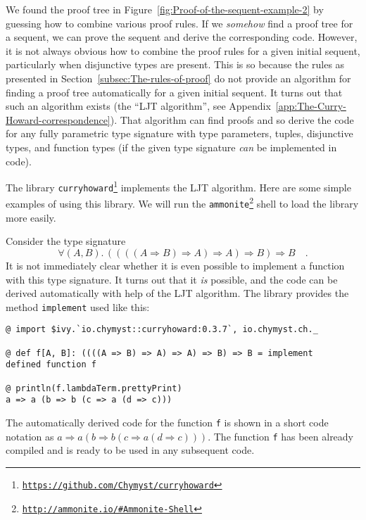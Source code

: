 We found the proof tree in Figure~\ref{fig:Proof-of-the-sequent-example-2}
by guessing how to combine various proof rules. If we \emph{somehow}
find a proof tree for a sequent, we can prove the sequent and derive
the corresponding code. However, it is not always obvious how to combine
the proof rules for a given initial sequent, particularly when disjunctive
types are present. This is so because the rules as presented in Section~\ref{subsec:The-rules-of-proof}
do not provide an algorithm for finding a proof tree automatically
for a given initial sequent. It turns out that such an algorithm exists
(the ``LJT algorithm'', see Appendix~\ref{app:The-Curry-Howard-correspondence}).
That algorithm can find proofs and so derive the code for any fully
parametric type signature with type parameters, tuples, disjunctive
types, and function types (if the given type signature \emph{can}
be implemented in code).

The library \texttt{curryhoward}\footnote{\texttt{\href{https://github.com/Chymyst/curryhoward}{https://github.com/Chymyst/curryhoward}}}
implements the LJT algorithm. Here are some simple examples of using
this library. We will run the \texttt{ammonite}\footnote{\texttt{\href{http://ammonite.io/\#Ammonite-Shell}{http://ammonite.io/\#Ammonite-Shell}}}
shell to load the library more easily.

Consider the type signature 
\[
\forall(A,B).\,\left(\left(\left(\left(A\Rightarrow B\right)\Rightarrow A\right)\Rightarrow A\right)\Rightarrow B\right)\Rightarrow B\quad.
\]
It is not immediately clear whether it is even possible to implement
a function with this type signature. It turns out that it \emph{is}
possible, and the code can be derived automatically with help of the
LJT algorithm. The library provides the method \lstinline!implement!
used like this:
\begin{lstlisting}
@ import $ivy.`io.chymyst::curryhoward:0.3.7`, io.chymyst.ch._

@ def f[A, B]: ((((A => B) => A) => A) => B) => B = implement
defined function f

@ println(f.lambdaTerm.prettyPrint)
a => a (b => b (c => a (d => c)))
\end{lstlisting}
The automatically derived code for the function \lstinline!f!
is shown in a short code notation as $a\Rightarrow a\left(b\Rightarrow b\left(c\Rightarrow a\left(d\Rightarrow c\right)\right)\right)$.
The function \lstinline!f!
has been already compiled and is ready to be used in any subsequent
code.

